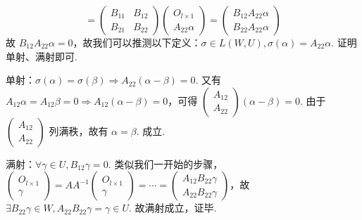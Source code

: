 \begin{enumerate}
    \[=\begin{pmatrix}B_{11} & B_{12} \\ B_{21} & B_{22}\end{pmatrix}\begin{pmatrix}O_{l\times 1} \\ A_{22}\alpha\end{pmatrix}=\begin{pmatrix}B_{12}A_{22}\alpha \\ B_{22}A_{22}\alpha\end{pmatrix}\]
    故 $B_{12}A_{22}\alpha=0$，故我们可以推测以下定义：$\sigma\in L(W,U),\sigma(\alpha)=A_{22}\alpha$.
    证明单射、满射即可.

    单射：$\sigma(\alpha)=\sigma(\beta)\Rightarrow A_{22}(\alpha-\beta)=0$. 又有 $A_{12}\alpha=A_{12}\beta=0\Rightarrow A_{12}(\alpha-\beta)=0$，可得 $\begin{pmatrix}A_{12} \\ A_{22}\end{pmatrix}(\alpha-\beta) = 0$. 由于 $\begin{pmatrix}A_{12} \\ A_{22}\end{pmatrix}$ 列满秩，故有 $\alpha=\beta$. 成立.

    满射：$\forall \gamma\in U,B_{12}\gamma = 0.$ 类似我们一开始的步骤，$\begin{pmatrix}O_{l\times 1} \\ \gamma\end{pmatrix}=AA^{-1}\begin{pmatrix}O_{l\times 1} \\ \gamma\end{pmatrix}= \cdots = \begin{pmatrix}A_{12}B_{22}\gamma \\ A_{22}B_{22}\gamma\end{pmatrix}$，故 $\exists B_{22}\gamma \in W,A_{22}B_{22}\gamma=\gamma\in U$. 故满射成立，证毕.
\end{enumerate}

\clearpage
